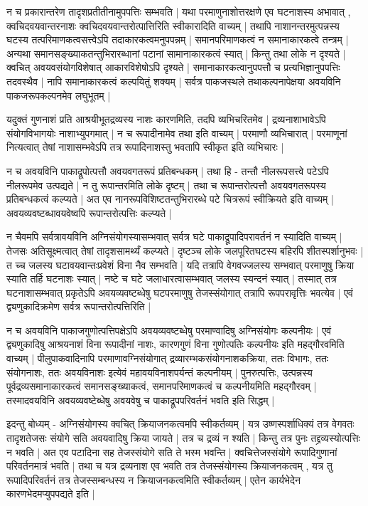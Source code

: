 न च प्रकारान्तरेण तादृशप्रतीतीनामुपपत्तिः सम्भवति | यथा परमाणुनाशोत्तरक्षणे एव घटनाशस्य अभावात् , क्वचिदवयवान्तरनाशः क्वचिदवयवान्तरोत्पात्तिरिति स्वीकारादिति वाच्यम् | तथापि नाशानन्तरमुत्पन्नस्य घटस्य तत्परिमाणकत्वसत्त्वेऽपि तदाकारकत्वमनुपपन्नम् | समानपरिमाणकत्वं न समानाकारकत्वे तन्त्रम् | अन्यथा समानसङ्ख्याकतन्तुभिरारब्धानां पटानां सामानाकारकत्वं स्यात् | किन्तु तथा लोके न दृश्यते | क्वचित् अवयवसंयोगविशेषात् आकारविशेषोऽपि दृश्यते | समानाकारकत्वानुपपत्तौ च प्रत्यभिज्ञानुपपत्तिः तदवस्थैव | नापि समानाकारकत्वं कल्पयितुं शक्यम् | सर्वत्र पाकजस्थले तथाकल्पनापेक्षया अवयविनि पाकजरूपकल्पनमेव लघुभूतम् |

यदुक्तं गुणनाशं प्रति आश्रयीभूतद्रव्यस्य नाशः‌ कारणमिति, तदपि व्यभिचरितमेव | द्रव्यनाशाभावेऽपि संयोगविभागयोः नाशाभ्युपगमात् | न च रूपादीनामेव तथा इति वाच्यम् | परमाणौ व्यभिचारात् |‌ परमाणूनां नित्यत्वात् तेषां नाशासम्भवेऽपि तत्र रूपादिनाशस्तु भवतापि स्वीकृत इति व्यभिचारः | 

न च अवयविनि पाकाद्रूपोत्पत्तौ अवयवगतरूपं प्रतिबन्धकम् | तथा हि - तन्तौ नीलरूपसत्त्वे पटेऽपि नीलरूपमेव उत्पद्यते | न तु रूपान्तरमिति लोके दृष्टम् | तथा च रूपान्तरोत्पत्तौ अवयवगतरूपस्य प्रतिबन्धकत्वं कल्प्यते | अत एव नानरूपविशिष्टतन्तुभिरारब्धे पटे चित्ररूपं स्वीक्रियते इति वाच्यम् | अवयव्यवष्टब्धावयवेष्वपि रूपान्तरोत्पत्तिः कल्प्यते | 

न चैवमपि सर्वत्रावयविनि अग्निसंयोगस्यासम्भवात् सर्वत्र घटे पाकाद्रूपादिपरावर्तनं न स्यादिति वाच्यम् | तेजसः अतिसूक्ष्मत्वात् तेषां तादृशसामर्थ्यं कल्प्यते |‌ दृष्टञ्च लोके जलपूरितघटस्य बहिरपि शीतस्पर्शानुभवः | त च्च जलस्य घटावयवान्तःप्रवेशं विना नैव सम्भवति | यदि तत्रापि वेगवज्जलस्य सम्भवात् परमाणुषु क्रिया स्याति तर्हि घटनाशः स्यात् | नष्टे च घटे जलाधारत्वासम्भवात् जलस्य स्यन्दनं स्यात् | तस्मात् तत्र घटनाशासम्भवात् प्रकृतेऽपि अवयव्यवष्टब्धेषु घटपरमाणुषु तेजस्संयोगात् तत्रापि रूपपरावृत्तिः भवत्येव |‌ एवं द्व्यणुकादिक्रमेण सर्वत्र रूपान्तरोत्पत्तिरिति |

न च अवयविनि पाकाजगुणोत्पत्तिपक्षेऽपि  अवयव्यवष्टब्धेषु परमाण्वादिषु अग्निसंयोगः कल्पनीयः | एवं द्व्यणुकादिषु आश्रयनाशं विना रूपादीनां नाशः, कारणगुणं विना गुणोत्पतिः कल्पनीयः इति महद्गौरवमिति वाच्यम् | पीलुपाकवादिनापि परमाणावग्निसंयोगात् द्रव्यारम्भकसंयोगनाशकक्रिया, ततः विभागः, ततः संयोगनाशः, ततः अवयविनाशः इत्येवं महावयविनाशपर्यन्तं कल्पनीयम् | पुनरुत्पत्तिः, उत्पन्नस्य पूर्वद्रव्यसमानाकारकत्वं समानसङ्ख्याकत्वं, समानपरिमाणकत्वं च कल्पनीयमिति महद्गौरवम् | तस्मादवयविनि अवयव्यवष्टेब्धेषु अवयवेषु च पाकाद्रूपपरिवर्तनं भवति इति सिद्धम् |

इदन्तु बोध्यम् - अग्निसंयोगस्य क्वचित् क्रियाजनकत्वमपि स्वीकर्तव्यम् | यत्र उष्णस्पर्शाधिक्यं तत्र वेगवतः तादृशतेजसः संयोगे सति अवयवादिषु क्रिया जायते | तत्र च द्रव्यं न श्यति | किन्तु तत्र पुनः तद्द्रव्यस्योत्पत्तिः न भवति | अत एव पटादिना सह तेजस्संयोगे सति ते भस्म भवन्ति | क्वचित्तेजस्संयोगे रूपादिगुणानां परिवर्तनमात्रं भवति | तथा च यत्र द्रव्यनाश एव भवति तत्र तेजस्संयोगस्य क्रियाजनकत्वम् , यत्र तु रूपादिपरिवर्तनं तत्र तेजस्सम्बन्धस्य  न क्रियाजनकत्वमिति स्वीकर्तव्यम् | एतेन कार्यभेदेन कारणभेदमप्युपपद्यते इति |
